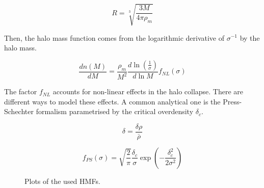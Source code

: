 \begin{equation}
    R= \sqrt[3]{\frac{3M}{4\pi \rho_m}}
\end{equation}

Then, the halo mass function comes from the logarithmic derivative of $\sigma^{-1}$ by the halo mass.

\begin{equation}
    \frac{dn(M)}{dM }=\frac{\rho_m}{M^2}\frac{d\ln (\frac{1}{\sigma})}{d\ln M}f_{NL}(\sigma)
\end{equation}

The factor $f_{NL}$ accounts for non-linear effects in the halo collapse. There are different ways to model these effects. A common analytical one is the Press-Schechter formalism parametrised by the critical overdensity $\delta_c$.

\begin{equation}
    \delta = \frac{\delta \rho}{\bar{\rho}}
\end{equation}

\begin{equation}
    f_{PS}(\sigma)=\sqrt{\frac{2}{\pi}} \frac{\delta_c}{\sigma}\exp(-\frac{\delta_c^2}{2\sigma^2})
\end{equation}

\begin{figure}[h]
    \centering
    \caption{Plots of the used HMFs.}
    \label{HMF_plots}
\end{figure} 

